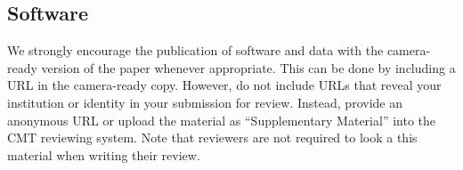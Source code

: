 \subsection{Software}

We strongly encourage the publication of software and data with the
camera-ready version of the paper whenever appropriate.  This can be
done by including a URL in the camera-ready copy.  However, do not
include URLs that reveal your institution or identity in your
submission for review.  Instead, provide an anonymous URL or upload
the material as ``Supplementary Material'' into the CMT reviewing
system.  Note that reviewers are not required to look a this material
when writing their review.